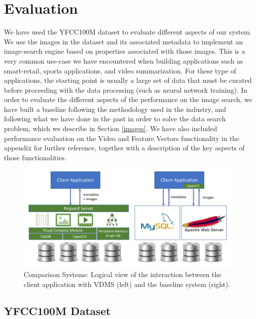 \section{Evaluation}
\label{eval}

We have used the YFCC100M dataset to evaluate different aspects of our system.
We use the images in the dataset and its associated metadata to implement
an image-search engine based on properties associated with those images.
This is a very common use-case we have encountered when building
applications such as smart-retail, sports applications, and video summarization.
For these type of applications, the starting point is usually
a large set of data that must be curated
before proceeding with the data processing (such as neural network training).
In order to evaluate the different aspects of the performance on the
image search, we have built a baseline following the methodology
used in the industry, and following what we have done in the past
in order to solve the data search problem,
which we describe in Section \ref{images}.
We have also included performance evaluation on the Video and Feature Vectors
functionality in the appendix for further reference, together with a
description of the key aspects of those functionalities.

\begin{figure}
\centering
\includegraphics[width=\textwidth]{figures/comparison_system}
\caption{Comparison Systems: Logical view of the interaction between the client application with VDMS (left) and the baseline system (right).}
\label{fig:systems}
\end{figure}

\subsection{YFCC100M Dataset}
\label{dataset}

